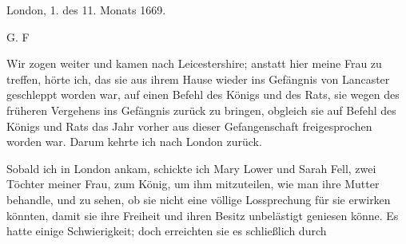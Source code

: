 {  \begin{flushright}
  London, 1. des 11. Monats 1669. 

  G. F 
  \end{flushright}

}

Wir zogen weiter und kamen nach Leicestershire; anstatt
hier meine Frau zu treffen, hörte ich, das sie aus ihrem Hause
wieder ins Gefängnis von Lancaster geschleppt worden war,
auf einen Befehl des Königs und des Rats, sie wegen des
früheren Vergehens ins Gefängnis zurück zu bringen, obgleich
sie auf Befehl des Königs und Rats das Jahr vorher aus dieser
Gefangenschaft freigesprochen worden war. Darum kehrte ich nach
London zurück.

Sobald ich in London ankam, schickte ich Mary Lower und
Sarah Fell, zwei Töchter meiner Frau, zum König, um ihm 
mitzuteilen, wie man ihre Mutter behandle, und zu sehen, ob sie
nicht eine völlige Lossprechung für sie erwirken könnten, damit sie
ihre Freiheit und ihren Besitz unbelästigt geniesen könne. Es
hatte einige Schwierigkeit; doch erreichten sie es schließlich durch
